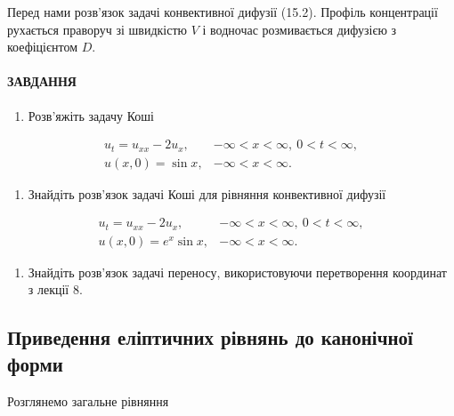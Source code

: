 \documentclass[
  ukrainian,
]{article}
\providecommand{\tightlist}{%
  \setlength{\itemsep}{0pt}\setlength{\parskip}{0pt}}
\begin{document}
Перед нами розв'язок задачі конвективної дифузії (15.2). Профіль
концентрації рухається праворуч зі швидкістю \(V\) і водночас
розмивається дифузією з коефіцієнтом \(D\).

\paragraph{ЗАВДАННЯ}\label{ux437ux430ux432ux434ux430ux43dux43dux44f-1}

\begin{enumerate}
\def\labelenumi{\arabic{enumi}.}
\tightlist
\item
  Розв'яжіть задачу Коші
\end{enumerate}

\[
\begin{array}{ll} u_t = u_{xx} - 2u_x, & -\infty < x < \infty, \ 0 < t < \infty, \\ u(x, 0) = \sin x, & -\infty < x < \infty. \end{array}
\]

\begin{enumerate}
\def\labelenumi{\arabic{enumi}.}
\setcounter{enumi}{1}
\tightlist
\item
  Знайдіть розв'язок задачі Коші для рівняння конвективної дифузії
\end{enumerate}

\[
\begin{array}{ll} u_t = u_{xx} - 2u_x, & -\infty < x < \infty, \ 0 < t < \infty, \\ u(x, 0) = e^x \sin x, & -\infty < x < \infty. \end{array}
\]

\begin{enumerate}
\def\labelenumi{\arabic{enumi}.}
\setcounter{enumi}{2}
\tightlist
\item
  Знайдіть розв'язок задачі переносу, використовуючи перетворення
  координат з лекції 8.
\end{enumerate}

\subsection{Приведення еліптичних рівнянь до канонічної
форми}\label{ux43fux440ux438ux432ux435ux434ux435ux43dux43dux44f-ux435ux43bux456ux43fux442ux438ux447ux43dux438ux445-ux440ux456ux432ux43dux44fux43dux44c-ux434ux43e-ux43aux430ux43dux43eux43dux456ux447ux43dux43eux457-ux444ux43eux440ux43cux438}

Розглянемо загальне рівняння
\end{document}
